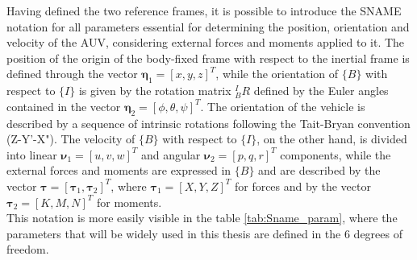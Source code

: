 Having defined the two reference frames, it is possible to introduce the SNAME notation for all parameters essential for determining the position, orientation 
and velocity of the AUV, considering external forces and moments applied to it. The position of the origin of the body-fixed frame with respect to the inertial 
frame is defined through the vector $\mathbf{\eta}_1 = [x, y, z]^T$, while the orientation of $\{B\}$ with respect to $\{I\}$ is given by the rotation matrix 
$^{I}_{B}R$ defined by the Euler angles contained in the vector $\mathbf{\eta}_2 = [\phi, \theta, \psi]^T$. The orientation of the vehicle is described by a sequence 
of intrinsic rotations following the Tait-Bryan convention (Z-Y'-X").
The velocity of $\{B\}$ with respect to $\{I\}$, on the other hand, is divided into linear $\mathbf{\nu}_1 = [u, v, w]^T$ and angular $\mathbf{\nu}_2 = [p, q, r]^T$ 
components, while the external forces and moments are expressed in $\{B\}$ and are described by the vector $\mathbf{\tau} = [\mathbf{\tau}_1, \mathbf{\tau}_2]^T$, 
where $\mathbf{\tau}_1 = [X, Y, Z]^T$ for forces and by the vector $\mathbf{\tau}_2 = [K, M, N]^T$ for moments.\\

This notation is more easily visible in the table \ref{tab:Sname_param}, where the parameters that will be widely used in this thesis are defined in the 6 degrees of freedom.

\begin{table}[H]
    \centering
    \caption{SNAME nomenclature and symbols \cite{abreuSensorbasedFormationControl2014}.}
    \label{tab:Sname_param}
\end{table}

